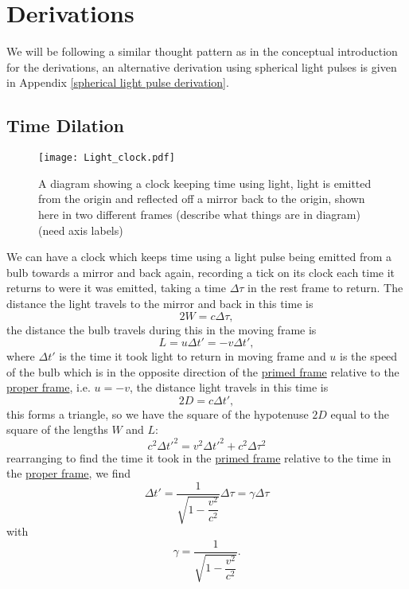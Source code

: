 \section{Derivations}%
We will be following a similar thought pattern as in the conceptual introduction for the derivations, an alternative derivation using spherical light pulses is given in Appendix \ref{spherical light pulse derivation}.

\subsection{Time Dilation}

\begin{figure}[ht]
\centering
\texttt{[image: Light\_clock.pdf]}
    \caption{A diagram showing a clock keeping time using light, light is emitted from the origin and reflected off a mirror back to the origin, shown here in two different frames (describe what things are in diagram)(need axis labels)}
    \label{fig: light clock}
\end{figure}

We can have a clock which keeps time using a light pulse being emitted from a bulb towards a mirror and back again, recording a tick on its clock each time it returns to were it was emitted, taking a time $\Delta \tau$ in the rest frame to return. The distance the light travels to the mirror and back in this time is
\begin{equation}
    2W=c\Delta \tau,
\end{equation}
the distance the bulb travels during this in the moving frame is 
\begin{equation}
    L=u\Delta t' = -v \Delta t',
\end{equation}
where $\Delta t'$ is the time it took light to return in moving frame and $u$ is the speed of the bulb which is in the opposite direction of the \hyperlink{def-Primed-Frame}{primed frame} relative to the \hyperlink{def-proper-frame}{proper frame}, i.e. $u=-v$, the distance light travels in this time is 
\begin{equation}
    2D=c\Delta t',
\end{equation} 
this forms a triangle, so we have the square of the hypotenuse $2D$ equal to the square of the lengths $W$ and $L$:
\begin{equation}%
    c^2 \Delta t'^2 = v^2 \Delta t'^2 + c^2\Delta \tau^2 
\end{equation}%
rearranging to find the time it took in the \hyperlink{def-Primed-Frame}{primed frame} relative to the time in the \hyperlink{def-proper-frame}{proper frame}, we find 
\begin{equation}%
     \Delta t' = \dfrac{1}{\sqrt{1-\dfrac{v^2}{c^2}}} \Delta \tau = \gamma \Delta \tau
\end{equation}%
with 
\begin{equation}%
   \gamma =  \dfrac{1}{\sqrt{1-\dfrac{v^2}{c^2}}}.
\end{equation}%

